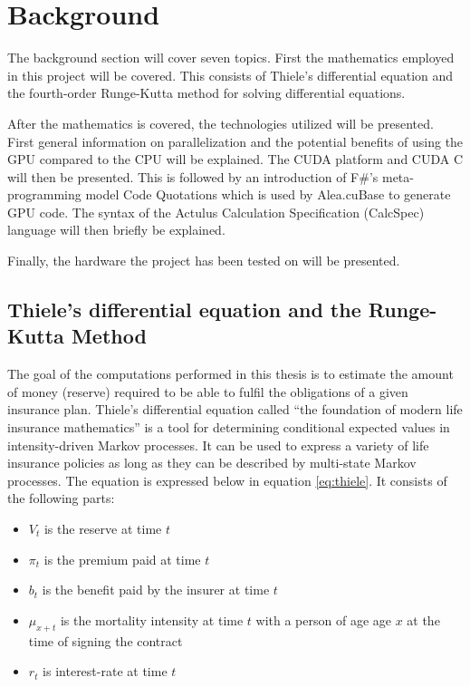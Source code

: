\section{Background}
The background section will cover seven topics.
First the mathematics employed in this project will be covered. 
This consists of Thiele's differential equation and the fourth-order Runge-Kutta method for solving differential equations.

After the mathematics is covered, the technologies utilized will be presented.
First general information on parallelization and the potential benefits of using the GPU compared to the CPU will be explained.
The CUDA platform and CUDA C will then be presented.
This is followed by an introduction of F\#'s meta-programming model Code Quotations which is used by Alea.cuBase to generate GPU code.
The syntax of the Actulus Calculation Specification (CalcSpec) language will then briefly be explained.

Finally, the hardware the project has been tested on will be presented.


\subsection{Thiele's differential equation and the Runge-Kutta Method}
The goal of the computations performed in this thesis is to estimate the amount of money (reserve) required to be able to fulfil the obligations of a given insurance plan.
Thiele's differential equation\cite{thiele} called ``the foundation of modern life insurance mathematics''\cite{bergermathematik} is a tool for determining conditional expected values in intensity-driven Markov processes. %
It can be used to express a variety of life insurance policies as long as they can be described by multi-state Markov processes. %
The equation is expressed below in equation \ref{eq:thiele}. It consists of the following parts:

\begin{itemize}
\item $V_t$ is the reserve at time $t$
\item $\pi_t$ is the premium paid at time $t$
\item $b_t$ is the benefit paid by the insurer at time $t$
\item $\mu_{x+t}$ is the mortality intensity at time $t$ with a person of age age $x$ at the time of signing the contract
\item $r_t$ is interest-rate at time $t$
\end{itemize}

